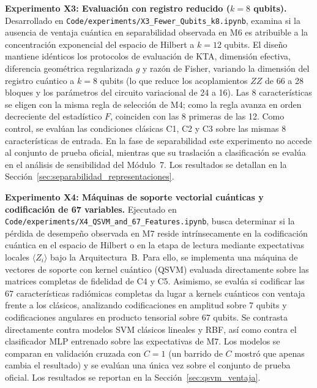 \textbf{Experimento X3: Evaluación con registro reducido ($k = 8$ qubits).} Desarrollado en
\texttt{Code/}\allowbreak\texttt{experiments/}\allowbreak\texttt{X3\_Fewer\_Qubits\_k8.ipynb}, examina si la ausencia de ventaja cuántica
en separabilidad observada en M6 es atribuible a la concentración exponencial del espacio de Hilbert a $k = 12$ qubits. El diseño
mantiene idénticos los protocolos de evaluación de KTA, dimensión efectiva, diferencia geométrica regularizada $g$ y razón de Fisher,
variando la dimensión del registro cuántico a $k = 8$ qubits (lo que reduce los acoplamientos $ZZ$ de 66 a 28 bloques y los parámetros
del circuito variacional de 24 a 16). Las 8 características se eligen con la misma regla de selección de M4; como la regla avanza en orden decreciente del estadístico $F$, coinciden con las 8 primeras de las 12. Como control,
se evalúan las condiciones clásicas C1, C2 y C3 sobre las mismas 8 características de entrada. En la fase de separabilidad este
experimento no accede al conjunto de prueba oficial, mientras que su traslación a clasificación se evalúa en el análisis de sensibilidad
del Módulo~7. Los resultados se detallan en la Sección~\ref{sec:separabilidad_representaciones}.

\textbf{Experimento X4: Máquinas de soporte vectorial cuánticas y codificación de 67 variables.} Ejecutado en
\texttt{Code/}\allowbreak\texttt{experiments/}\allowbreak\texttt{X4\_QSVM\_and\_67\_Features.ipynb}, busca determinar si la pérdida de
desempeño observada en M7 reside intrínsecamente en la codificación cuántica en el espacio de Hilbert o en la etapa de lectura
mediante expectativas locales $\langle Z_i \rangle$ bajo la Arquitectura~B. Para ello, se implementa una máquina de vectores de
soporte con kernel cuántico (QSVM) evaluada directamente sobre las matrices completas de fidelidad de C4 y C5. Asimismo, se evalúa si
codificar las 67 características radiómicas completas da lugar a kernels cuánticos con ventaja frente a los
clásicos, analizando codificaciones en amplitud sobre 7 qubits y codificaciones angulares en producto tensorial sobre 67 qubits. Se
contrasta directamente contra modelos SVM clásicos lineales y RBF, así como contra el clasificador MLP entrenado sobre las expectativas
de M7. Los modelos se comparan en validación cruzada con $C = 1$ (un barrido de $C$ mostró que apenas cambia el resultado) y se evalúan una única vez sobre el conjunto de prueba oficial.
Los resultados se reportan en la Sección~\ref{sec:qsvm_ventaja}.

